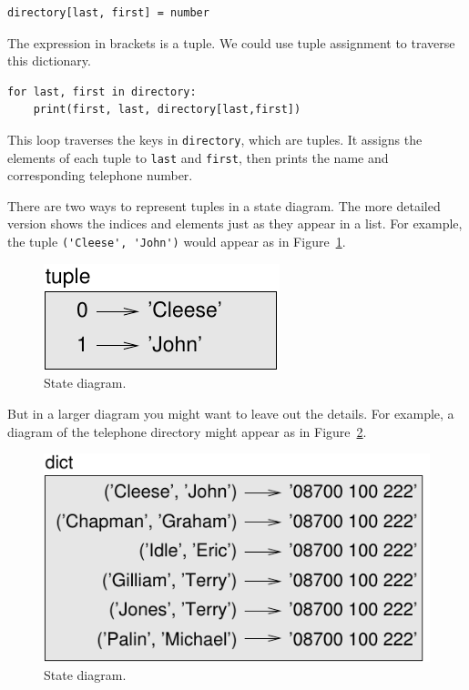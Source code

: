 \documentclass[10pt]{book}
\begin{document}
\begin{verbatim}
directory[last, first] = number
\end{verbatim}
%
The expression in brackets is a tuple.  We could use tuple
assignment to traverse this dictionary.

\begin{verbatim}
for last, first in directory:
    print(first, last, directory[last,first])
\end{verbatim}
%
This loop traverses the keys in {\tt directory}, which are tuples.  It
assigns the elements of each tuple to {\tt last} and {\tt first}, then
prints the name and corresponding telephone number.

There are two ways to represent tuples in a state diagram.  The more
detailed version shows the indices and elements just as they appear in
a list.  For example, the tuple \verb"('Cleese', 'John')" would appear
as in Figure~\ref{fig.tuple1}.

\begin{figure}
\centerline
{\includegraphics[scale=0.8]{figs/tuple1.pdf}}
\caption{State diagram.}
\label{fig.tuple1}
\end{figure}

But in a larger diagram you might want to leave out the
details.  For example, a diagram of the telephone directory might
appear as in Figure~\ref{fig.dict2}.

\begin{figure}
\centerline
{\includegraphics[scale=0.8]{figs/dict2.pdf}}
\caption{State diagram.}
\label{fig.dict2}
\end{figure}
\end{document}
